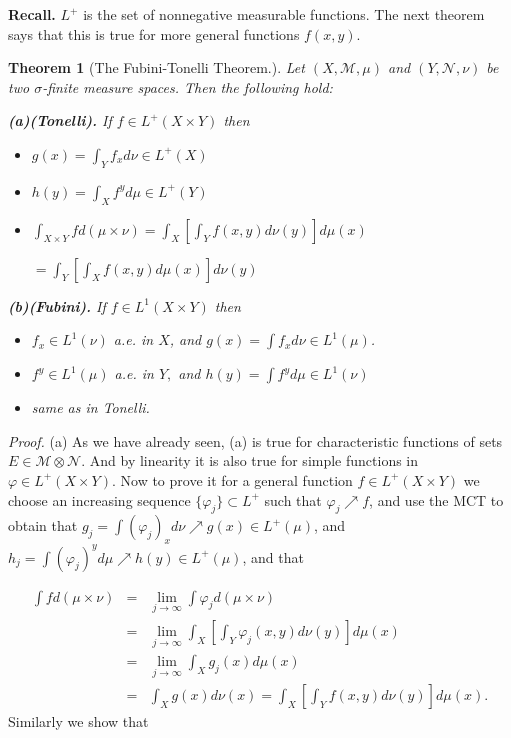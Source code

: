 \documentclass[12pt]{report}
\newtheorem{theorem}{Theorem}[section]
\begin{document}
\vspace{.25cm}
\noindent
\textbf{Recall.}  $L^+$ is the set of nonnegative measurable
functions.  The next theorem says that this is true for more
general functions $f(x, y)$.

\vspace{.25cm}
\noindent
\begin{theorem}[The Fubini-Tonelli Theorem.]  Let $(X,
\mathcal{M}, \mu)$ and $(Y, \mathcal{N}, \nu)$ be two
$\sigma$-finite measure spaces.  Then the following hold:

\vspace{.25cm}
\noindent
\textbf{(a)(Tonelli).}    If $f \in L^+ (X \times Y)$ then 
\begin{itemize}
\item[1.]  $g(x) = \int_Y f_x d \nu \in L^+ (X)$
\item[2.]  $h(y) = \int_X f^y d \mu \in L^+ (Y)$
\item[3.]  $\int_{X \times Y} fd (\mu \times \nu) =
\int_X \left [ \int_Y f(x, y) d \nu(y) \right ] d \mu(x)$

\hspace{3.cm} 
$= \int_Y \left [ \int_X f(x, y) d \mu(x) \right ] d \nu(y)$
\end{itemize}

\vspace{.25cm}
\noindent
\textbf{(b)(Fubini).}  If $f \in L^1(X \times Y)$ then
\begin{itemize}
\item[1.]  $f_x \in L^1 (\nu) $ a.e. in $X$, and $g(x) = \int f_x d
\nu \in  L^1(\mu)$.
\item[2.]  $f^y \in L^1 (\mu)$ a.e. in $Y,$ and $h(y) =
\int f^y d \mu \in L^1 (\nu)$
\item[3.]  same as in Tonelli.
\end{itemize}
\end{theorem}
{\em Proof.} 
(a)  As we have already seen, (a) is
true for characteristic functions of sets $E \in \mathcal{M}
\otimes \mathcal{N}$.  And by linearity it is also true for
simple functions in $\varphi \in L^+(X \times Y)$.  Now
to prove it for a general function $ f \in L^+ (X \times Y)$ we
choose an increasing sequence $\{\varphi_j\} \subset L^+$
such that $\varphi_j \nearrow f$, and use the MCT to obtain
that $g_j = \int (\varphi_j)_x d \nu \nearrow g(x) \in
L^+(\mu)$, and  $ h_j = \int (\varphi_j)^y d \mu \nearrow h(y) \in
L^+(\mu)$, and that 

\begin{eqnarray*}
\int f d(\mu \times \nu) &=& \lim\limits_{j \to \infty} \int \varphi_j
d (\mu \times \nu)\\
&=& \lim\limits_{j \to \infty} \int_X \left [ \int_Y \varphi_j (x, y) d
\nu(y) \right ] d \mu(x)\\
&=& \lim\limits_{j \to \infty} \int_X g_j (x) d \mu(x)\\
&=& \int_X g(x) d \nu(x) = \int_X \left [ \int_Y f(x, y) d \nu(y)
\right ] d \mu(x).
\end{eqnarray*}
Similarly we show that
\end{document}
